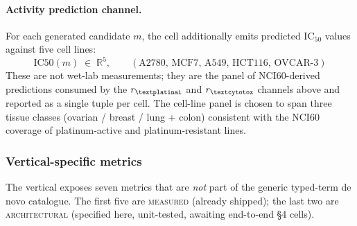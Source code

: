 \paragraph{Activity prediction channel.}
For each generated candidate $m$, the cell additionally emits
predicted IC$_{50}$ values against five cell lines:
\begin{equation}
  \label{eq:metallodrug-celllines}
  \mathrm{IC50}(m) \;\in\;
  \mathbb{R}^{5},\qquad
  (\text{A2780},\,\text{MCF7},\,\text{A549},\,
   \text{HCT116},\,\text{OVCAR-3})
\end{equation}
These are not wet-lab measurements; they are the panel of
NCI60-derived predictions consumed by the
$r_\textplatinai$ and $r_\textcytotox$ channels above and
reported as a single tuple per cell. The cell-line panel is
chosen to span three tissue classes (ovarian / breast /
lung + colon) consistent with the NCI60 coverage of
platinum-active and platinum-resistant lines.

\subsubsection{Vertical-specific metrics}
\label{sec:metallodrug-vertical-metrics}

The vertical exposes seven metrics that are \emph{not} part
of the generic typed-term de novo catalogue. The first five
are \textsc{measured} (already shipped); the last two are
\textsc{architectural} (specified here, unit-tested, awaiting
end-to-end \S4 cells).

